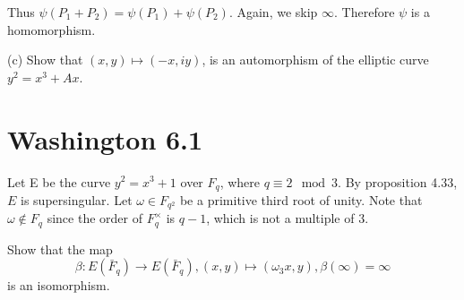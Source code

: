 \documentclass{article}
\begin{document}
Thus $\psi(P_1 + P_2) = \psi(P_1) + \psi(P_2)$. Again, we skip $\infty$. Therefore $\psi$ is a homomorphism.

(c) Show that $(x, y) \mapsto (−x, iy)$, is an automorphism of the elliptic curve $y^2 = x^3 + Ax$.

\section{Washington 6.1}
Let E be the curve $y^2 = x^3+1$ over $F_q$, where $q \equiv 2 \mod 3$. By proposition 4.33, $E$ is supersingular. Let $\omega \in F_{q^2}$ be a primitive third root of unity. Note that $\omega \not \in F_q$ since the order of $F_q^\times$ is $q−1$, which is not a multiple of $3$.

Show that the map
$$\beta: E(\bar F_q) \to E(\bar F_q), (x,y) \mapsto (\omega_3 x, y), \beta(\infty) = \infty$$
is an isomorphism.
\end{document}
